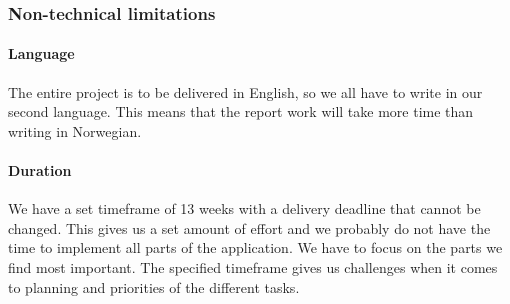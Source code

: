 \subsubsection{Non-technical limitations}

\paragraph{Language}\hfill
\newline
The entire project is to be delivered in English, so we all have to write in our second language. This means that the report work will take more time than writing in Norwegian. 

\paragraph{Duration}\hfill
\newline
We have a set timeframe of 13 weeks with a delivery deadline that cannot be changed. This gives us a set amount of effort and we probably do not have the time to implement all parts of the application. We have to focus on the parts we find most important. The specified timeframe gives us challenges when it comes to planning and priorities of the different tasks.